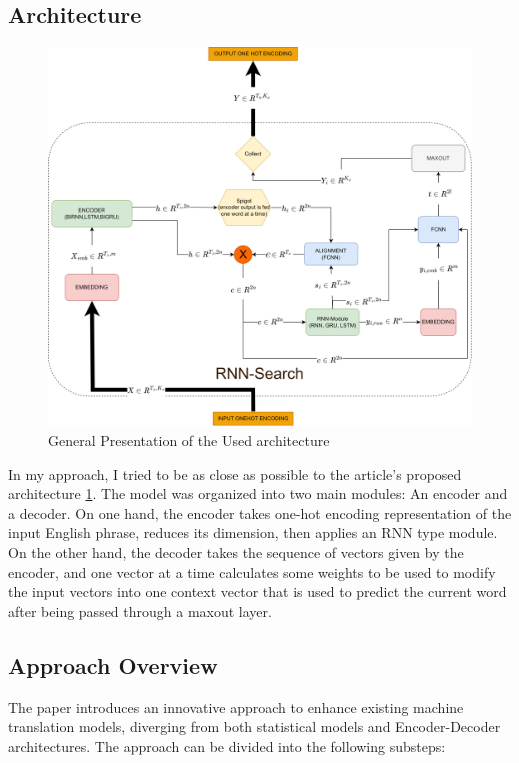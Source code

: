 \subsection{Architecture}

\begin{figure}[h]
    \centering
    \includegraphics[width=\textwidth]{architecture.png}
    \caption{General Presentation of the Used architecture}
    \label{fig:architecture}
\end{figure}

In my approach, I tried to be as close as possible to the article's proposed architecture \ref{fig:architecture}. The model was organized into two main modules: An encoder and a decoder. On one hand, the encoder takes one-hot encoding representation of the input English phrase, reduces its dimension, then applies an RNN type module. On the other hand, the decoder takes the sequence of vectors given by the encoder, and one vector at a time calculates some weights to be used to modify the input vectors into one context vector that is used to predict the current word after being passed through a maxout layer.



\subsection{Approach Overview}

The paper introduces an innovative approach to enhance existing machine translation models, diverging from both statistical models and Encoder-Decoder architectures. The approach can be divided into the following substeps:

